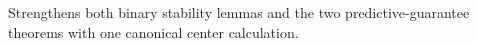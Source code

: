 Strengthens both binary stability lemmas and the two predictive-guarantee theorems with one canonical center calculation.